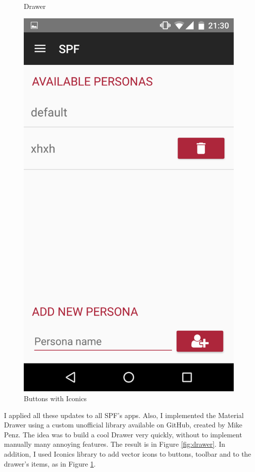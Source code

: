 \begin{figure}[thpb]
\begin{minipage}[b]{0.4\textwidth}
	\caption{Drawer}
	\label{fig:drawer}
\end{minipage}
\hfill
\begin{minipage}[b]{0.4\textwidth}
	\centering
	\includegraphics[scale=0.1]{./images/chap3/bottom_iconics.png}
	\caption{Buttons with Iconics}
	\label{fig:buttom-iconics}
\end{minipage}	
\end{figure}	

I applied all these updates to all SPF's apps. Also, I implemented the \textsf{Material Drawer} using a custom unofficial library available on GitHub, created by Mike Penz. The idea was to build a cool Drawer very quickly, without to implement manually many annoying features. The result is in Figure \ref{fig:drawer}. In addition, I used \textsf{Iconics} library to add vector icons to buttons, toolbar and to the drawer's items, as in Figure \ref{fig:buttom-iconics}.

